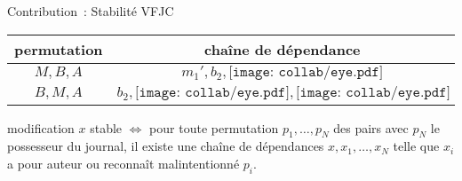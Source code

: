 \begin{frame}{Contribution~: Stabilité \acs{VFJC}}
    \newcommand{\eye}{\texttt{[image: collab/eye.pdf]}}
    \begin{minipage}[c][.3\textheight][t]{\textwidth}
    \end{minipage}
    \begin{minipage}{\textwidth}
        \centering
        \begin{tabular}{cc}
            permutation & chaîne de dépendance\\
            \toprule
            $M, B, A$ & $m_1', b_2, \eye$\\
            $B, M, A$ & $b_2, \eye, \eye$\\
        \end{tabular}
    \end{minipage}
    \begin{minipage}{\textwidth}
        \begin{theorem}
            modification $x$ stable $\iff$ pour toute permutation $p_1, \dotsc, p_N$ des pairs avec $p_N$ le possesseur du journal, il existe une chaîne de dépendances $x, x_1, \dotsc, x_N$ telle que $x_i$ a pour auteur ou reconnaît malintentionné $p_i$.
        \end{theorem}
    \end{minipage}
\end{frame}


